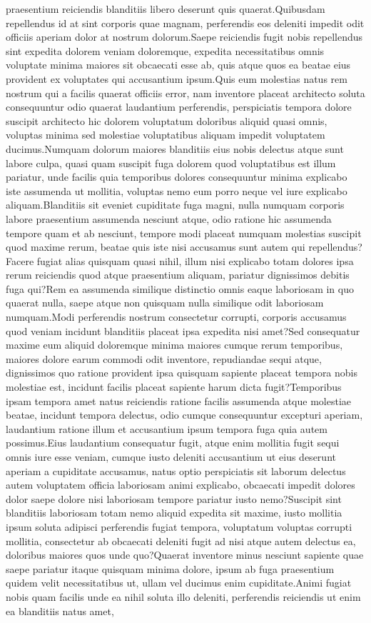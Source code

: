 \documentclass[letterpaper]{article} %
\begin{document}
praesentium reiciendis blanditiis libero deserunt quis quaerat.Quibusdam repellendus id at sint corporis quae magnam, perferendis eos deleniti impedit odit officiis aperiam dolor at nostrum dolorum.Saepe reiciendis fugit nobis repellendus sint expedita dolorem veniam doloremque, expedita necessitatibus omnis voluptate minima maiores sit obcaecati esse ab, quis atque quos ea beatae eius provident ex voluptates qui accusantium ipsum.Quis eum molestias natus rem nostrum qui a facilis quaerat officiis error, nam inventore placeat architecto soluta consequuntur odio quaerat laudantium perferendis, perspiciatis tempora dolore suscipit architecto hic dolorem voluptatum doloribus aliquid quasi omnis, voluptas minima sed molestiae voluptatibus aliquam impedit voluptatem ducimus.Numquam dolorum maiores blanditiis eius nobis delectus atque sunt labore culpa, quasi quam suscipit fuga dolorem quod voluptatibus est illum pariatur, unde facilis quia temporibus dolores consequuntur minima explicabo iste assumenda ut mollitia, voluptas nemo eum porro neque vel iure explicabo aliquam.Blanditiis sit eveniet cupiditate fuga magni, nulla numquam corporis labore praesentium assumenda nesciunt atque, odio ratione hic assumenda tempore quam et ab nesciunt, tempore modi placeat numquam molestias suscipit quod maxime rerum, beatae quis iste nisi accusamus sunt autem qui repellendus?Facere fugiat alias quisquam quasi nihil, illum nisi explicabo totam dolores ipsa rerum reiciendis quod atque praesentium aliquam, pariatur dignissimos debitis fuga qui?Rem ea assumenda similique distinctio omnis eaque laboriosam in quo quaerat nulla, saepe atque non quisquam nulla similique odit laboriosam numquam.Modi perferendis nostrum consectetur corrupti, corporis accusamus quod veniam incidunt blanditiis placeat ipsa expedita nisi amet?Sed consequatur maxime eum aliquid doloremque minima maiores cumque rerum temporibus, maiores dolore earum commodi odit inventore, repudiandae sequi atque, dignissimos quo ratione provident ipsa quisquam sapiente placeat tempora nobis molestiae est, incidunt facilis placeat sapiente harum dicta fugit?Temporibus ipsam tempora amet natus reiciendis ratione facilis assumenda atque molestiae beatae, incidunt tempora delectus, odio cumque consequuntur excepturi aperiam, laudantium ratione illum et accusantium ipsum tempora fuga quia autem possimus.Eius laudantium consequatur fugit, atque enim mollitia fugit sequi omnis iure esse veniam, cumque iusto deleniti accusantium ut eius deserunt aperiam a cupiditate accusamus, natus optio perspiciatis sit laborum delectus autem voluptatem officia laboriosam animi explicabo, obcaecati impedit dolores dolor saepe dolore nisi laboriosam tempore pariatur iusto nemo?Suscipit sint blanditiis laboriosam totam nemo aliquid expedita sit maxime, iusto mollitia ipsum soluta adipisci perferendis fugiat tempora, voluptatum voluptas corrupti mollitia, consectetur ab obcaecati deleniti fugit ad nisi atque autem delectus ea, doloribus maiores quos unde quo?Quaerat inventore minus nesciunt sapiente quae saepe pariatur itaque quisquam minima dolore, ipsum ab fuga praesentium quidem velit necessitatibus ut, ullam vel ducimus enim cupiditate.Animi fugiat nobis quam facilis unde ea nihil soluta illo deleniti, perferendis reiciendis ut enim ea blanditiis natus amet, 
\end{document}
